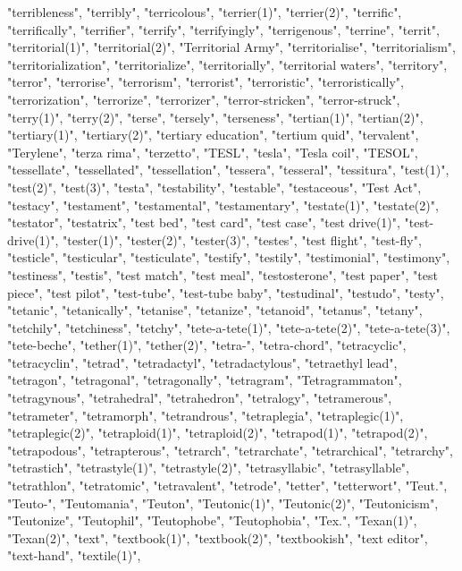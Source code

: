 "terribleness",
"terribly",
"terricolous",
"terrier(1)",
"terrier(2)",
"terrific",
"terrifically",
"terrifier",
"terrify",
"terrifyingly",
"terrigenous",
"terrine",
"territ",
"territorial(1)",
"territorial(2)",
"Territorial Army",
"territorialise",
"territorialism",
"territorialization",
"territorialize",
"territorially",
"territorial waters",
"territory",
"terror",
"terrorise",
"terrorism",
"terrorist",
"terroristic",
"terroristically",
"terrorization",
"terrorize",
"terrorizer",
"terror-stricken",
"terror-struck",
"terry(1)",
"terry(2)",
"terse",
"tersely",
"terseness",
"tertian(1)",
"tertian(2)",
"tertiary(1)",
"tertiary(2)",
"tertiary education",
"tertium quid",
"tervalent",
"Terylene",
"terza rima",
"terzetto",
"TESL",
"tesla",
"Tesla coil",
"TESOL",
"tessellate",
"tessellated",
"tessellation",
"tessera",
"tesseral",
"tessitura",
"test(1)",
"test(2)",
"test(3)",
"testa",
"testability",
"testable",
"testaceous",
"Test Act",
"testacy",
"testament",
"testamental",
"testamentary",
"testate(1)",
"testate(2)",
"testator",
"testatrix",
"test bed",
"test card",
"test case",
"test drive(1)",
"test-drive(1)",
"tester(1)",
"tester(2)",
"tester(3)",
"testes",
"test flight",
"test-fly",
"testicle",
"testicular",
"testiculate",
"testify",
"testily",
"testimonial",
"testimony",
"testiness",
"testis",
"test match",
"test meal",
"testosterone",
"test paper",
"test piece",
"test pilot",
"test-tube",
"test-tube baby",
"testudinal",
"testudo",
"testy",
"tetanic",
"tetanically",
"tetanise",
"tetanize",
"tetanoid",
"tetanus",
"tetany",
"tetchily",
"tetchiness",
"tetchy",
"tete-a-tete(1)",
"tete-a-tete(2)",
"tete-a-tete(3)",
"tete-beche",
"tether(1)",
"tether(2)",
"tetra-",
"tetra-chord",
"tetracyclic",
"tetracyclin",
"tetrad",
"tetradactyl",
"tetradactylous",
"tetraethyl lead",
"tetragon",
"tetragonal",
"tetragonally",
"tetragram",
"Tetragrammaton",
"tetragynous",
"tetrahedral",
"tetrahedron",
"tetralogy",
"tetramerous",
"tetrameter",
"tetramorph",
"tetrandrous",
"tetraplegia",
"tetraplegic(1)",
"tetraplegic(2)",
"tetraploid(1)",
"tetraploid(2)",
"tetrapod(1)",
"tetrapod(2)",
"tetrapodous",
"tetrapterous",
"tetrarch",
"tetrarchate",
"tetrarchical",
"tetrarchy",
"tetrastich",
"tetrastyle(1)",
"tetrastyle(2)",
"tetrasyllabic",
"tetrasyllable",
"tetrathlon",
"tetratomic",
"tetravalent",
"tetrode",
"tetter",
"tetterwort",
"Teut.",
"Teuto-",
"Teutomania",
"Teuton",
"Teutonic(1)",
"Teutonic(2)",
"Teutonicism",
"Teutonize",
"Teutophil",
"Teutophobe",
"Teutophobia",
"Tex.",
"Texan(1)",
"Texan(2)",
"text",
"textbook(1)",
"textbook(2)",
"textbookish",
"text editor",
"text-hand",
"textile(1)",
